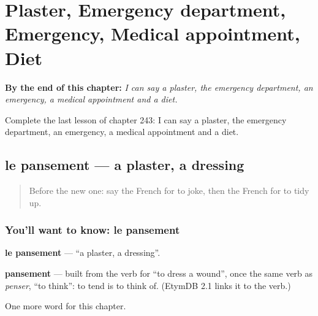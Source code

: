 
\chapter{Plaster, Emergency department, Emergency, Medical appointment, Diet}
\label{ch:fr-plaster-emergency-department-emergency-medical-appointment-diet}

\begin{chapteropening}
\textbf{By the end of this chapter:} \emph{I can say a plaster, the emergency department, an emergency, a medical appointment and a diet.}

Complete the last lesson of chapter 243: I can say a plaster, the emergency department, an emergency, a medical appointment and a diet.
\end{chapteropening}

\section[le pansement]{le pansement — a plaster, a dressing}

\label{lesson:FR-C243-pansement}



\begin{quote}
Before the new one: say the French for to joke, then the French for to tidy up.
\end{quote}

\subsection*{You'll want to know: le pansement}
\textbf{le pansement} — \textquotedblleft{}a plaster, a dressing\textquotedblright{}.

\begin{cousinweb}
\textbf{pansement} — built from the verb for \textquotedblleft{}to dress a wound\textquotedblright{}, once the same verb as \emph{penser}, \textquotedblleft{}to think\textquotedblright{}: to tend is to think of. (EtymDB 2.1 links it to the verb.)
\end{cousinweb}

\begin{grammarlens}[title={What you've built}]
One more word for this chapter.
\end{grammarlens}

